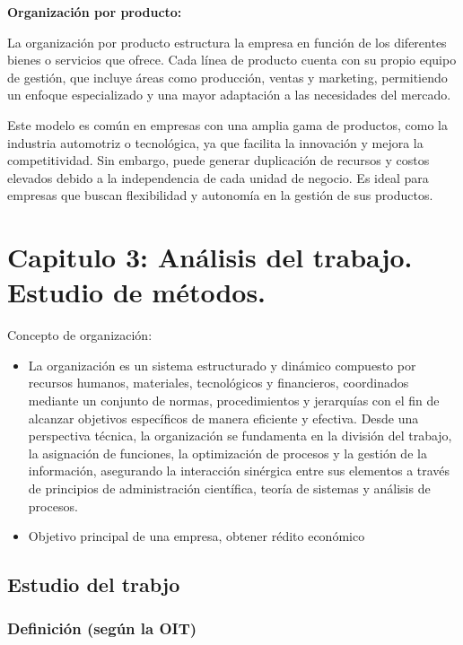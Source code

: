\documentclass[a4paper,oneside,11pt]{article}
\begin{document}
\textbf{Organización por producto:}

La organización por producto estructura la empresa en función de los diferentes bienes o servicios que ofrece. Cada línea de producto cuenta con su propio equipo de gestión, que incluye áreas como producción, ventas y marketing, permitiendo un enfoque especializado y una mayor adaptación a las necesidades del mercado.

Este modelo es común en empresas con una amplia gama de productos, como la industria automotriz o tecnológica, ya que facilita la innovación y mejora la competitividad. Sin embargo, puede generar duplicación de recursos y costos elevados debido a la independencia de cada unidad de negocio. Es ideal para empresas que buscan flexibilidad y autonomía en la gestión de sus productos.


\newpage


\section{Capitulo 3: Análisis del trabajo. Estudio de métodos.}


Concepto de organización: 

\begin{itemize}
    \item La organización es un sistema estructurado y dinámico compuesto por recursos humanos, materiales, tecnológicos y financieros, coordinados mediante un conjunto de normas, procedimientos y jerarquías con el fin de alcanzar objetivos específicos de manera eficiente y efectiva. Desde una perspectiva técnica, la organización se fundamenta en la división del trabajo, la asignación de funciones, la optimización de procesos y la gestión de la información, asegurando la interacción sinérgica entre sus elementos a través de principios de administración científica, teoría de sistemas y análisis de procesos.

    \item Objetivo principal de una empresa, obtener rédito económico
\end{itemize}



\subsection{Estudio del trabjo}

\subsubsection{Definición (según la OIT)}
\end{document}
